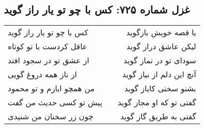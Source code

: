 \begin{center}
\section*{غزل شماره ۷۲۵: کس با چو تو یار راز گوید}
\label{sec:0725}
\begin{longtable}{l p{0.5cm} r}
کس با چو تو یار راز گوید
&&
یا قصه خویش بازگوید
\\
عاقل کردست با تو کوتاه
&&
لیکن عاشق دراز گوید
\\
از عشق تو در سجود افتد
&&
سودای تو در نماز گوید
\\
از ناز همه دروغ گویی
&&
آنچ این دلم از نیاز گوید
\\
من همچو ایازم و تو محمود
&&
بشنو سخنی کایاز گوید
\\
پیش تو کسی حدیث من گفت
&&
گفتی تو که او مجاز گوید
\\
چون زر سخنان من شنیدی
&&
گفتی به طریق گاز گوید
\\
\end{longtable}
\end{center}
